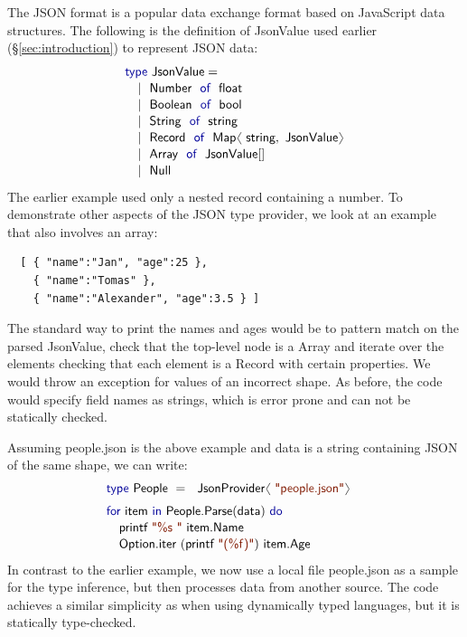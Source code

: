 \documentclass[10pt]{sigplanconf}
\newcommand{\langl}{\begin{picture}(4.5,7)
\put(1.1,2.5){\rotatebox{60}{\line(1,0){5.5}}}
\put(1.1,2.5){\rotatebox{300}{\line(1,0){5.5}}}
\end{picture}}
\newcommand{\rangl}{\begin{picture}(4.5,7)
\put(.9,2.5){\rotatebox{120}{\line(1,0){5.5}}}
\put(.9,2.5){\rotatebox{240}{\line(1,0){5.5}}}
\end{picture}}
\newcommand{\kvd}[1]{\textnormal{\textcolor{kvdclr}{\sffamily #1}}}
\newcommand{\str}[1]{\textnormal{\textcolor{strclr}{\sffamily "#1"}}}
\newcommand{\strf}[1]{\textnormal{\textcolor{strclr}{\sffamily #1}}}
\newcommand{\ident}[1]{\textnormal{\sffamily #1}}
\begin{document}
The JSON format is a popular data exchange format based on 
JavaScript data structures. The following is the definition of \ident{JsonValue} 
used earlier (\S\ref{sec:introduction}) to represent JSON data:
%
\begin{equation*}
\begin{array}{l}
 \kvd{type}~\ident{JsonValue} = \\[0.1em]
 \quad|~ \ident{Number}~\kvd{of}~\ident{float} \\[0.1em]
 \quad|~ \ident{Boolean}~\kvd{of}~\ident{bool} \\[0.1em]
 \quad|~ \ident{String}~\kvd{of}~\ident{string}\\[0.1em]
 \quad|~ \ident{Record}~\kvd{of}~\ident{Map}\langl\ident{string}, \ident{JsonValue}\rangl \\[0.1em]
 \quad|~ \ident{Array}~\kvd{of}~\ident{JsonValue}[] \\[0.1em]
 \quad|~ \ident{Null} \\[0.1em]
\end{array}
\end{equation*}
%
The earlier example used only a nested record containing a number. To demonstrate other 
aspects of the JSON type provider, we look at an example that also involves an array:
%
{\small{
\begin{verbatim}
  [ { "name":"Jan", "age":25 }, 
    { "name":"Tomas" },
    { "name":"Alexander", "age":3.5 } ]
\end{verbatim}
}}
%
\noindent
The standard way to print the names and ages would be to pattern match on the parsed 
\ident{JsonValue}, check that the top-level node is a \ident{Array} and iterate over the elements 
checking that each element is a \ident{Record} with certain properties. We would throw an exception 
for values of an incorrect shape. As before, the code would specify field names as strings, which 
is error prone and can not be statically checked.

Assuming \strf{people.json} is the above example and \ident{data} is a string containing
JSON of the same shape, we can write:
%
\begin{equation*}
\begin{array}{l}
 \kvd{type}~\ident{People}~=~\ident{JsonProvider}\langl\str{people.json}\rangl\hspace{1em} \\[0.6em]
 \kvd{for}~\ident{item}~\kvd{in}~\ident{People.Parse}(\ident{data})~\kvd{do}\\[0.1em]
 \quad\ident{printf}~\str{\%s }~\ident{item.Name}\\[0.1em]
 \quad\ident{Option.iter}~(\ident{printf}~\str{(\%f)})~\ident{item.Age}
\end{array}
\end{equation*}
%
In contrast to the earlier example, we now use a local file \strf{people.json} as a sample for 
the type inference, but then processes data from another source. The code achieves a similar 
simplicity as when using dynamically typed languages, but it is statically type-checked.
\end{document}
